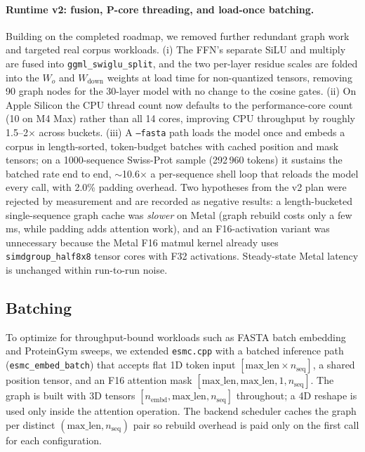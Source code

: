 \documentclass{article}
\begin{document}
\paragraph{Runtime v2: fusion, P-core threading, and load-once batching.}
Building on the completed roadmap, we removed further redundant graph work and targeted real corpus workloads. (i) The FFN's separate SiLU and multiply are fused into \texttt{ggml\_swiglu\_split}, and the two per-layer residue scales are folded into the $W_o$ and $W_{\text{down}}$ weights at load time for non-quantized tensors, removing 90 graph nodes for the 30-layer model with no change to the cosine gates. (ii) On Apple Silicon the CPU thread count now defaults to the performance-core count (10 on M4 Max) rather than all 14 cores, improving CPU throughput by roughly 1.5--2$\times$ across buckets. (iii) A \texttt{--fasta} path loads the model once and embeds a corpus in length-sorted, token-budget batches with cached position and mask tensors; on a 1000-sequence Swiss-Prot sample (292\,960 tokens) it sustains the batched rate end to end, $\sim$10.6$\times$ a per-sequence shell loop that reloads the model every call, with 2.0\% padding overhead. Two hypotheses from the v2 plan were rejected by measurement and are recorded as negative results: a length-bucketed single-sequence graph cache was \emph{slower} on Metal (graph rebuild costs only a few ms, while padding adds attention work), and an F16-activation variant was unnecessary because the Metal F16 matmul kernel already uses \texttt{simdgroup\_half8x8} tensor cores with F32 activations. Steady-state Metal latency is unchanged within run-to-run noise.

\subsection{Batching}
\label{sec:batching}

To optimize for throughput-bound workloads such as FASTA batch embedding and ProteinGym sweeps, we extended \texttt{esmc.cpp} with a batched inference path (\texttt{esmc\_embed\_batch}) that accepts flat 1D token input $[\text{max\_len} \times n_{\text{seq}}]$, a shared position tensor, and an F16 attention mask $[\text{max\_len}, \text{max\_len}, 1, n_{\text{seq}}]$. The graph is built with 3D tensors $[n_{\text{embd}}, \text{max\_len}, n_{\text{seq}}]$ throughout; a 4D reshape is used only inside the attention operation. The backend scheduler caches the graph per distinct $(\text{max\_len}, n_{\text{seq}})$ pair so rebuild overhead is paid only on the first call for each configuration.
\end{document}
